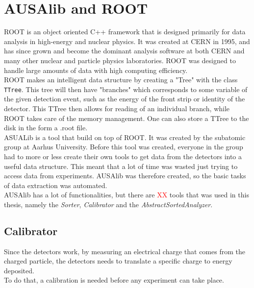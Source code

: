\section{AUSAlib and ROOT}
ROOT is an object oriented C++ framework that is designed primarily for data analysis in high-energy and nuclear physics. It was created at CERN in 1995, and has since grown and become the dominant analysis software at both CERN and many other nuclear and particle physics laboratories. 
ROOT was designed to handle large amounts of data with high computing efficiency. \\
ROOT makes an intelligent data structure by creating a "Tree" with the class \texttt{TTree}. This tree will then have "branches" which corresponds to some variable of the given detection event, such as the energy of the front strip or identity of the detector. This TTree then allows for reading of an individual branch, while ROOT takes care of the memory management. One can also store a TTree to the disk in the form a .root file. \\

ASUALib is a tool that build on top of ROOT. It was created by the subatomic group at Aarhus University.
Before this tool was created, everyone in the group had to more or less create their own tools to get data from the detectors into a useful data structure. This meant that a lot of time was wasted just trying to access data from experiments. AUSAlib was therefore created, so the basic tasks of data extraction was automated. \\
AUSAlib has a lot of functionalities, but there are \textcolor{red}{XX} tools that was used in this thesis, namely the \textit{Sorter}, \textit{Calibrator} and the \textit{AbstractSortedAnalyzer}.

\subsection{Calibrator}
Since the detectors work, by measuring an electrical charge that comes from the charged particle, the detectors needs to translate a specific charge to energy deposited. \\
To do that, a calibration is needed before any experiment can take place. 



